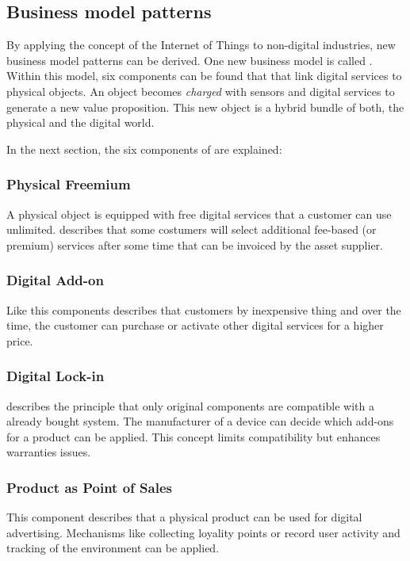 \subsection{Business model patterns}
By applying the concept of the Internet of Things to non-digital industries, new business model patterns can be derived. One new business model is called . Within this model, six components can be found that that link digital services to physical objects. An object becomes \textit{charged} with sensors and digital services to generate a new value proposition. This new object is a hybrid bundle of both, the physical and the digital world.

In the next section, the six components of  are explained:

\subsubsection{Physical Freemium}
A physical object is equipped with free digital services that a customer can use unlimited.  describes that some costumers will select additional fee-based (or premium) services after some time that can be invoiced by the asset supplier.

\subsubsection{Digital Add-on}
Like  this components describes that customers by inexpensive thing and over the time, the customer can purchase or activate other digital services for a higher price.

\subsubsection{Digital Lock-in}
 describes the principle that only original components are compatible with a already bought system. The manufacturer of a device can decide which add-ons for a product can be applied. This concept limits compatibility but enhances warranties issues.

\subsubsection{Product as Point of Sales}
This component describes that a physical product can be used for digital advertising. Mechanisms like collecting loyality points or record user activity and tracking of the environment can be applied.

